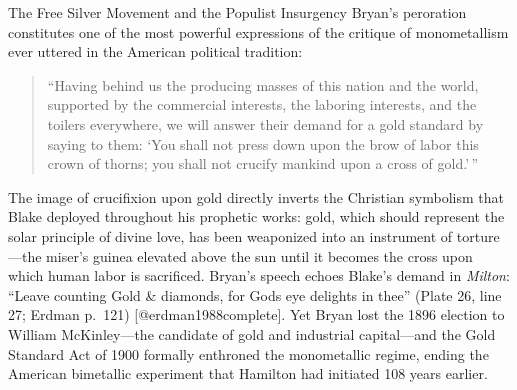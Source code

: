 \documentclass[
  ignorenonframetext,
]{beamer}
\begin{document}
\begin{frame}{The Free Silver Movement and the Populist Insurgency}
Bryan's peroration constitutes one of the most powerful expressions of
the critique of monometallism ever uttered in the American political
tradition:

\begin{quote}
``Having behind us the producing masses of this nation and the world,
supported by the commercial interests, the laboring interests, and the
toilers everywhere, we will answer their demand for a gold standard by
saying to them: `You shall not press down upon the brow of labor this
crown of thorns; you shall not crucify mankind upon a cross of
gold.'\,''
\end{quote}

The image of crucifixion upon gold directly inverts the Christian
symbolism that Blake deployed throughout his prophetic works: gold,
which should represent the solar principle of divine love, has been
weaponized into an instrument of torture---the miser's guinea elevated
above the sun until it becomes the cross upon which human labor is
sacrificed. Bryan's speech echoes Blake's demand in \emph{Milton}:
``Leave counting Gold \& diamonds, for Gods eye delights in thee''
(Plate 26, line 27; Erdman p.~121) {[}@erdman1988complete{]}. Yet Bryan
lost the 1896 election to William McKinley---the candidate of gold and
industrial capital---and the Gold Standard Act of 1900 formally
enthroned the monometallic regime, ending the American bimetallic
experiment that Hamilton had initiated 108 years earlier.
\end{frame}
\end{document}
